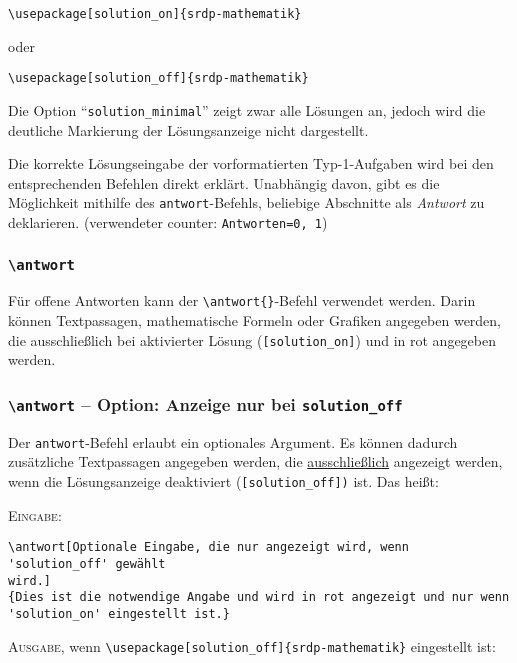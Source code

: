 \documentclass[a4paper,12pt]{article}
\begin{document}
\begin{verbatim}
\usepackage[solution_on]{srdp-mathematik}
\end{verbatim}

oder

\begin{verbatim}
\usepackage[solution_off]{srdp-mathematik}
\end{verbatim}

Die Option "`\texttt{solution\_minimal}"' zeigt zwar alle Lösungen an, jedoch wird die deutliche Markierung der Lösungsanzeige nicht dargestellt.\leer 

Die korrekte Lösungseingabe der vorformatierten Typ-1-Aufgaben wird bei den entsprechenden Befehlen direkt erklärt. Unabhängig davon, gibt es die Möglichkeit mithilfe des \texttt{antwort}-Befehls, beliebige Abschnitte als \textit{Antwort} zu deklarieren. (verwendeter counter: \texttt{Antworten=0, 1})   


\subsubsection{\texttt{\textbackslash antwort}}
Für offene Antworten kann der \texttt{\textbackslash antwort\{\}}-Befehl verwendet werden. Darin können Textpassagen, mathematische Formeln oder Grafiken angegeben werden, die ausschließlich bei aktivierter Lösung (\texttt{[solution\_on]}) und in \textcolor[rgb]{1,0,0}{rot} angegeben werden. \leer


\subsubsection*{\texttt{\textbackslash antwort} -- Option: Anzeige nur bei \texttt{solution\_off}}

Der \texttt{antwort}-Befehl erlaubt ein optionales Argument. Es können dadurch zusätzliche Textpassagen angegeben werden, die \underline{ausschließlich} angezeigt werden, wenn die Lösungsanzeige deaktiviert (\texttt{[solution\_off])} ist. Das heißt: \leer

\textsc{Eingabe:}
\begin{verbatim}
\antwort[Optionale Eingabe, die nur angezeigt wird, wenn 'solution_off' gewählt 
wird.]
{Dies ist die notwendige Angabe und wird in rot angezeigt und nur wenn 
'solution_on' eingestellt ist.}  
\end{verbatim}


\textsc{Ausgabe}, wenn \texttt{\textbackslash usepackage[solution\_off]\{srdp-mathematik\}} eingestellt ist: \\
\end{document}
